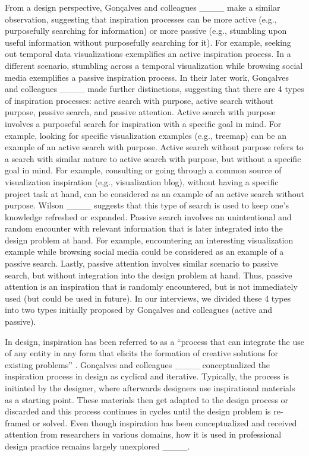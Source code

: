 From a design perspective, Gon\c{c}alves and colleagues ____ make a similar observation, suggesting that inspiration processes can be more active (e.g., purposefully searching for information) or more passive (e.g., stumbling upon useful information without purposefully searching for it). For example, seeking out temporal data visualizations exemplifies an active inspiration process. In a different scenario, stumbling across a temporal visualization while browsing social media exemplifies a passive inspiration process. In their later work, Gon\c{c}alves and colleagues ____ made further distinctions, suggesting that there are 4 types of inspiration processes: active search with purpose, active search without purpose, passive search, and passive attention. Active search with purpose involves a purposeful search for inspiration with a specific goal in mind. For example, looking for specific visualization examples (e.g., treemap) can be an example of an active search with purpose. Active search without purpose refers to a search with similar nature to active search with purpose, but without a specific goal in mind. For example, consulting or going through a common source of visualization inspiration (e,g., visualization blog), without having a specific project task at hand, can be considered as an example of an active search without purpose. Wilson ____ suggests that this type of search is used to keep one's knowledge refreshed or expanded. Passive search involves an unintentional and random encounter with relevant information that is later integrated into the design problem at hand. For example, encountering an interesting visualization example while browsing social media could be considered as an example of a passive search. Lastly, passive attention involves similar scenario to passive search, but without integration into the design problem at hand. Thus, passive attention is an inspiration that is randomly encountered, but is not immediately used (but could be used in future). In our interviews, we divided these 4 types into two types initially proposed by Gon\c{c}alves and colleagues (active and passive). 

In design, inspiration has been referred to as a ``process that can integrate the use of any entity in any form that elicits the formation of creative solutions for existing problems'' \cite[p. 29]{goncalves_what_2014}. Gon\c{c}alves and colleagues ____ conceptualized the inspiration process in design as cyclical and iterative. Typically, the process is initiated by the designer, where afterwards designers use inspirational materials as a starting point. These materials then get adapted to the design process or discarded and this process continues in cycles until the design problem is re-framed or solved. Even though inspiration has been conceptualized and received attention from researchers in various domains, how it is used in professional design practice remains largely unexplored ____.

